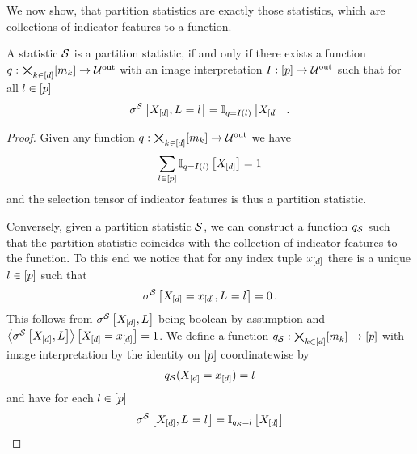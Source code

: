 We now show, that partition statistics are exactly those statistics, which are collections of indicator features to a function.

\begin{lemma}
    \label{lem:partitionStatisticFunctionIndicator}
    A statistic $\mathcal{S}$ is a partition statistic, if and only if there exists a function $q:\bigtimes_{k\in[d]}[m_{k}]\rightarrow\mathcal{U}^{\mathrm{out}}$ with an image interpretation $I : [p] \rightarrow \mathcal{U}^{\mathrm{out}}$ such that for all $l\in[p]$
    \begin{align*}
        \sigma^{\mathcal{S}}\left[X_{[d]},L_{}=l_{}\right] = \mathbb{I}_{q=I(l)}\left[X_{[d]}\right] \, .
    \end{align*}
\end{lemma}
\begin{proof}
    \proofleftsymbol
    Given any function $q:\bigtimes_{k\in[d]}[m_{k}]\rightarrow \mathcal{U}^{\mathrm{out}}$ we have
    \begin{align*}
        \sum_{l\in[p]} \mathbb{I}_{q=I(l)}\left[X_{[d]}\right] =1
    \end{align*}
    and the selection tensor of indicator features is thus a partition statistic.

    \proofrightsymbol
    Conversely, given a partition statistic $\mathcal{S}$, we can construct a function $q_{\mathcal{S}}$ such that the partition statistic coincides with the collection of indicator features to the function.
    To this end we notice that for any index tuple $x_{[d]}$ there is a unique $l\in[p]$ such that
    \begin{align*}
        \sigma^{\mathcal{S}}\left[X_{[d]}=x_{[d]},L_{}=l_{}\right] = 0 \, .
    \end{align*}
    This follows from $\sigma^{\mathcal{S}}\left[X_{[d]},L\right]$ being boolean by assumption and $\left\langle \sigma^{\mathcal{S}}\left[X_{[d]},L\right]\right\rangle \left[ X_{[d]}=x_{[d]} \right]=1$.
    We define a function $q_{\mathcal{S}}:\bigtimes_{k\in[d]}[m_{k}]\rightarrow[p]$ with image interpretation by the identity on $[p]$ coordinatewise by
    \begin{align*}
        q_{\mathcal{S}}(X_{[d]}=x_{[d]}) = l
    \end{align*}
    and have for each $l\in[p]$
    \begin{align*}
        \sigma^{\mathcal{S}}\left[X_{[d]},L_{}=l_{}\right] = \mathbb{I}_{q_{\mathcal{S}}=l}\left[X_{[d]}\right]
    \end{align*}
\end{proof}

